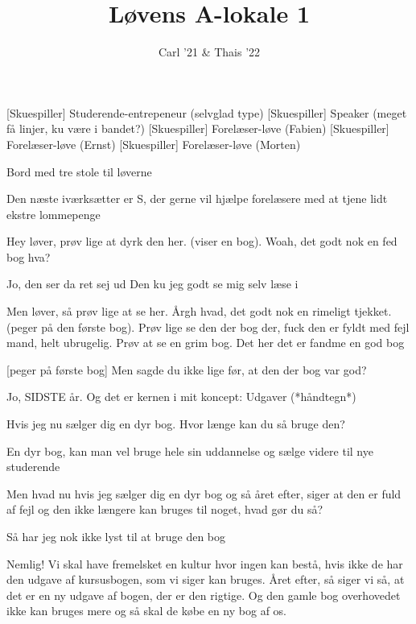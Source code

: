 \documentclass[a4paper,11pt]{article}
\title{Løvens A-lokale 1}
\author{Carl '21 \& Thais '22}
\begin{document}
\maketitle

\begin{roles}
[Skuespiller] Studerende-entrepeneur (selvglad type)
[Skuespiller] Speaker (meget få linjer, ku være i bandet?)
[Skuespiller] Forelæser-løve (Fabien)
[Skuespiller] Forelæser-løve (Ernst)
[Skuespiller] Forelæser-løve (Morten)
\end{roles}

\begin{props}
\item Bord med tre stole til løverne
\end{props}


\begin{sketch}
 Den næste iværksætter er S, der gerne vil hjælpe forelæsere med at tjene lidt ekstre lommepenge

 Hey løver, prøv lige at dyrk den her. (viser en bog). Woah, det godt nok en fed bog hva?

 Jo, den ser da ret sej ud
 Den ku jeg godt se mig selv læse i

 Men løver, så prøv lige at se her. Årgh hvad, det godt nok en rimeligt tjekket. (peger på den første bog). Prøv lige se den der bog der, fuck den er fyldt med fejl mand, helt ubrugelig. Prøv at se en grim bog. Det her det er fandme en god bog


[peger på første bog] Men sagde du ikke lige før, at den der bog var god?

 Jo, SIDSTE år. Og det er kernen i mit koncept: Udgaver (*håndtegn*)


 Hvis jeg nu sælger dig en dyr bog. Hvor længe kan du så bruge den?

 En dyr bog, kan man vel bruge hele sin uddannelse og sælge videre til nye studerende

 Men hvad nu hvis jeg sælger dig en dyr bog og så året efter, siger at den er fuld af fejl og den ikke længere kan bruges til noget, hvad gør du så?

 Så har jeg nok ikke lyst til at bruge den bog

 Nemlig! Vi skal have fremelsket en kultur hvor ingen kan bestå, hvis ikke de har den udgave af kursusbogen, som vi siger kan bruges. Året efter, så siger vi så, at det er en ny udgave af bogen, der er den rigtige. Og den gamle bog overhovedet ikke kan bruges mere og så skal de købe en ny bog af os. 


\end{sketch}
\end{document}
